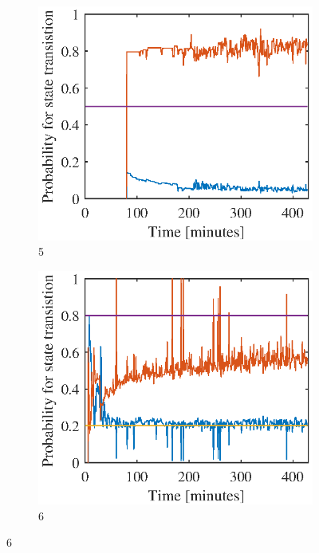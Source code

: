\begin{figure}[htbp]
	\begin{subfigure}[t]{0.5\linewidth}
		\centering
		\includegraphics[width=1\linewidth]{chapters/appendix/figures/learning_curves/obs5}
		\caption{5}
	\end{subfigure}
	\hspace*{\fill}
	\begin{subfigure}[t]{0.5\linewidth}
		\centering
		\includegraphics[width=1\linewidth]{chapters/appendix/figures/learning_curves/obs6}
		\caption{6}
	\end{subfigure}
	

\end{figure}
